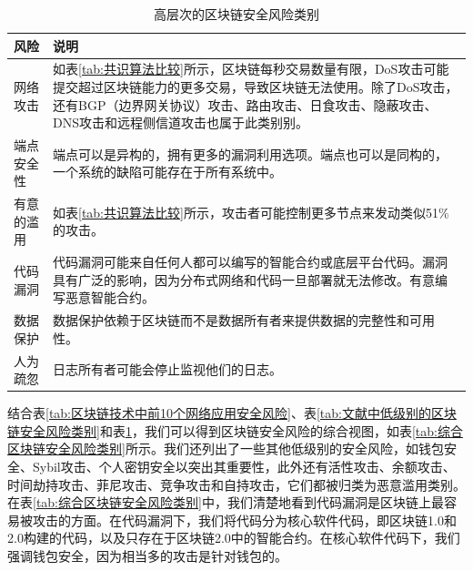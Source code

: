 \begin{translation}
\begin{longtable}[h] {|p{2.5cm}|p{10cm}|} 
    \caption{高层次的区块链安全风险类别} 
    \label{tab:高层次的区块链安全风险类别} \\ 
    \hline 风险 & 说明 \\
    \hline 网络攻击 & 如表\ref{tab:共识算法比较}所示，区块链每秒交易数量有限，DoS攻击可能提交超过区块链能力的更多交易，导致区块链无法使用。除了DoS攻击，还有BGP（边界网关协议）攻击、路由攻击、日食攻击、隐蔽攻击、DNS攻击和远程侧信道攻击也属于此类别别。 \\
    \hline 端点安全性 & 端点可以是异构的，拥有更多的漏洞利用选项。端点也可以是同构的，一个系统的缺陷可能存在于所有系统中。 \\
    \hline 有意的滥用 & 如表\ref{tab:共识算法比较}所示，攻击者可能控制更多节点来发动类似51\%的攻击。 \\
    \hline 代码漏洞 & 代码漏洞可能来自任何人都可以编写的智能合约或底层平台代码。漏洞具有广泛的影响，因为分布式网络和代码一旦部署就无法修改。有意编写恶意智能合约。 \\
    \hline 数据保护 & 数据保护依赖于区块链而不是数据所有者来提供数据的完整性和可用性。 \\
    \hline 人为疏忽 & 日志所有者可能会停止监视他们的日志。 \\
    \hline 
\end{longtable}

结合表\ref{tab:区块链技术中前10个网络应用安全风险}、表\ref{tab:文献中低级别的区块链安全风险类别}和表\ref{tab:高层次的区块链安全风险类别}，我们可以得到区块链安全风险的综合视图，如表\ref{tab:综合区块链安全风险类别}所示。我们还列出了一些其他低级别的安全风险，如钱包安全、Sybil攻击、个人密钥安全以突出其重要性，此外还有活性攻击、余额攻击、时间劫持攻击、菲尼攻击、竞争攻击和自持攻击，它们都被归类为恶意滥用类别。在表\ref{tab:综合区块链安全风险类别}中，我们清楚地看到代码漏洞是区块链上最容易被攻击的方面。在代码漏洞下，我们将代码分为核心软件代码，即区块链1.0和2.0构建的代码，以及只存在于区块链2.0中的智能合约。在核心软件代码下，我们强调钱包安全，因为相当多的攻击是针对钱包的。


\end{translation}

